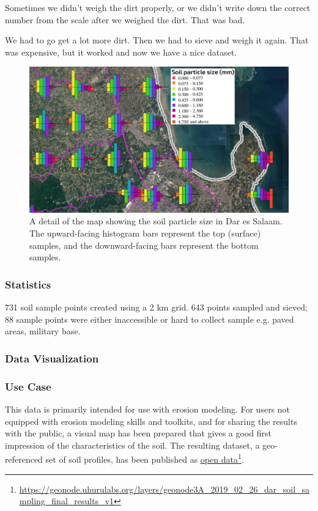 \documentclass[a4paper,12pt,twoside]{article}
\begin{document}
\bigskip

Sometimes we didn't weigh the dirt properly, or we didn't write down the correct number from the scale after we weighed the dirt. That was bad. 

We had to go get a lot more dirt. Then we had to sieve and weigh it again. That was expensive, but it worked and now we have a nice dataset.

\begin{figure}[h]
  \color{RHgreen}\caption{A detail of the map showing the soil particle size in Dar es Salaam. The upward-facing histogram bars represent the top (surface) samples, and the downward-facing bars represent the bottom samples.}
  \centering
  \includegraphics[width=1\textwidth]{soil_map_detail_peninsula_with_legend}
\end{figure}

\subsubsection{Statistics}
731 soil sample points created using a 2 km grid. 643 points sampled and sieved; 88 sample points were either inaccessible or hard to collect sample e.g. paved areas, military base.

\subsubsection{Data Visualization}

\subsubsection{Use Case}
This data is primarily intended for use with erosion modeling. For users not equipped with erosion modeling skills and toolkits, and for sharing the results with the public, a visual map has been prepared that gives a good first impression of the characteristics of the soil.
The resulting dataset, a geo-referenced set of soil profiles, has been published as \href{https://geonode.uhurulabs.org/layers/geonode3A_2019_02_26_dar_soil_sampling_final_results_v1}{open data}\footnote{\url{https://geonode.uhurulabs.org/layers/geonode3A_2019_02_26_dar_soil_sampling_final_results_v1}}.
\end{document}
